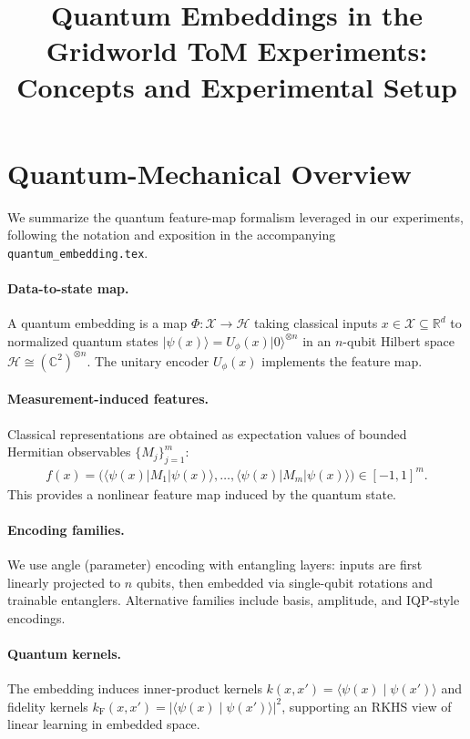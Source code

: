\documentclass[11pt]{article}
\title{Quantum Embeddings in the Gridworld ToM Experiments: Concepts and Experimental Setup}
\author{}
\date{}
\begin{document}
\maketitle

\section{Quantum-Mechanical Overview}

We summarize the quantum feature-map formalism leveraged in our experiments, following the notation and exposition in the accompanying \texttt{quantum\_embedding.tex}.

\paragraph{Data-to-state map.} A quantum embedding is a map \(\Phi: \mathcal{X} \to \mathcal{H}\) taking classical inputs \(x\in\mathcal{X}\subseteq\mathbb{R}^d\) to normalized quantum states \(\lvert\psi(x)\rangle = U_\phi(x)\lvert 0\rangle^{\otimes n}\) in an \(n\)-qubit Hilbert space \(\mathcal{H}\cong(\mathbb{C}^2)^{\otimes n}\). The unitary encoder \(U_\phi(x)\) implements the feature map.

\paragraph{Measurement-induced features.} Classical representations are obtained as expectation values of bounded Hermitian observables \(\{M_j\}_{j=1}^m\):
\begin{align}
  f(x) = \big(\langle\psi(x)\rvert M_1\lvert\psi(x)\rangle,\ldots,\langle\psi(x)\rvert M_m\lvert\psi(x)\rangle\big) \in [-1,1]^m.
\end{align}
This provides a nonlinear feature map induced by the quantum state.

\paragraph{Encoding families.} We use angle (parameter) encoding with entangling layers: inputs are first linearly projected to \(n\) qubits, then embedded via single-qubit rotations and trainable entanglers. Alternative families include basis, amplitude, and IQP-style encodings.

\paragraph{Quantum kernels.} The embedding induces inner-product kernels \(k(x,x')=\langle\psi(x)\mid\psi(x')\rangle\) and fidelity kernels \(k_\mathrm{F}(x,x')=|\langle\psi(x)\mid\psi(x')\rangle|^2\), supporting an RKHS view of linear learning in embedded space.
\end{document}

